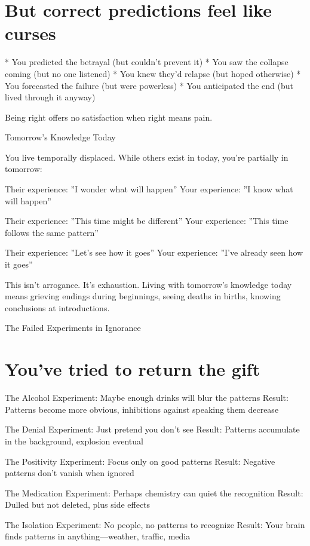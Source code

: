 \documentclass[12pt,oneside]{book}
\begin{document}
\section{But correct predictions feel like curses}

                    * You predicted the betrayal (but couldn't prevent it)
                    * You saw the collapse coming (but no one listened)
                    * You knew they'd relapse (but hoped otherwise)
                    * You forecasted the failure (but were powerless)
                    * You anticipated the end (but lived through it anyway)

Being right offers no satisfaction when right means pain.

Tomorrow's Knowledge Today

You live temporally displaced. While others exist in today, you're partially in tomorrow:

Their experience: ''I wonder what will happen'' Your experience: ''I know what will happen''

Their experience: ''This time might be different'' Your experience: ''This time follows the same pattern''

Their experience: ''Let's see how it goes'' Your experience: ''I've already seen how it goes''

This isn't arrogance. It's exhaustion. Living with tomorrow's knowledge today means grieving endings during beginnings, seeing deaths in births, knowing conclusions at introductions.

The Failed Experiments in Ignorance

\section{You've tried to return the gift}

The Alcohol Experiment: Maybe enough drinks will blur the patterns Result: Patterns become more obvious, inhibitions against speaking them decrease

The Denial Experiment: Just pretend you don't see Result: Patterns accumulate in the background, explosion eventual

The Positivity Experiment: Focus only on good patterns Result: Negative patterns don't vanish when ignored

The Medication Experiment: Perhaps chemistry can quiet the recognition Result: Dulled but not deleted, plus side effects

The Isolation Experiment: No people, no patterns to recognize Result: Your brain finds patterns in anything---weather, traffic, media
\end{document}
